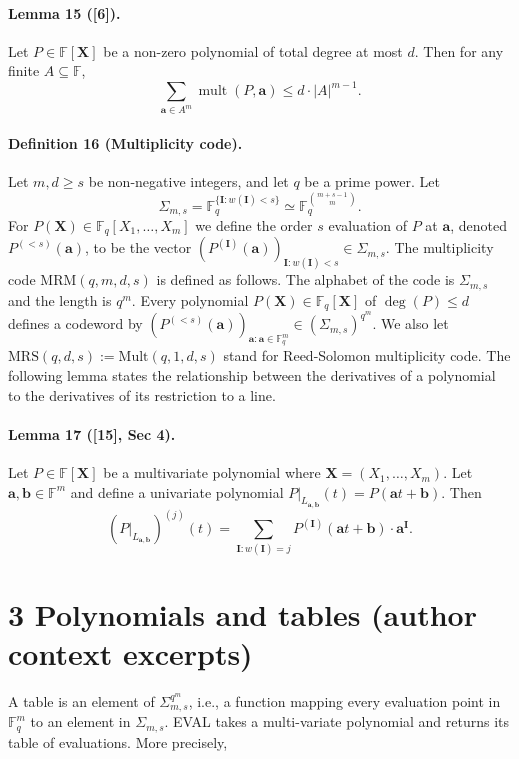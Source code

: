 \documentclass[10pt,a4paper]{article}
\begin{document}
\paragraph{Lemma 15 ([6]).} Let $P\in\mathbb F[\boldsymbol X]$ be a non-zero polynomial of total degree at most $d$. Then for any finite $A\subseteq\mathbb F$,
\[\sum_{\boldsymbol a\in A^m}\operatorname{mult}(P,\boldsymbol a)\leq d\cdot|A|^{m-1}.\]
\paragraph{Definition 16 (Multiplicity code).} Let $m,d\geq s$ be non-negative integers, and let $q$ be a prime power. Let
\[\Sigma_{m,s}=\mathbb F_q^{\{\boldsymbol I:w(\boldsymbol I)<s\}}\simeq\mathbb F_q^{\binom{m+s-1}{m}}.\]
For $P(\boldsymbol X)\in\mathbb F_q[X_1,\ldots,X_m]$ we define the order $s$ evaluation of $P$ at $\boldsymbol a$, denoted $P^{(<s)}(\boldsymbol a)$, to be the vector $(P^{(\boldsymbol I)}(\boldsymbol a))_{\boldsymbol I:w(\boldsymbol I)<s}\in\Sigma_{m,s}$. The multiplicity code $\mathrm{MRM}(q,m,d,s)$ is defined as follows. The alphabet of the code is $\Sigma_{m,s}$ and the length is $q^m$. Every polynomial $P(\boldsymbol X)\in\mathbb F_q[\boldsymbol X]$ of $\deg(P)\leq d$ defines a codeword by $(P^{(<s)}(\boldsymbol a))_{\boldsymbol a:\boldsymbol a\in\mathbb F_q^m}\in(\Sigma_{m,s})^{q^m}$.
We also let $\mathrm{MRS}(q,d,s):=\mathrm{Mult}(q,1,d,s)$ stand for Reed-Solomon multiplicity code.
The following lemma states the relationship between the derivatives of a polynomial to the derivatives of its restriction to a line.
\paragraph{Lemma 17 ([15], Sec 4).} Let $P\in\mathbb F[\boldsymbol X]$ be a multivariate polynomial where $\boldsymbol X=(X_1,\ldots,X_m)$. Let $\boldsymbol a,\boldsymbol b\in\mathbb F^m$ and define a univariate polynomial $P|_{L_{\boldsymbol a,\boldsymbol b}}(t)=P(\boldsymbol a t+\boldsymbol b)$. Then
\[(P|_{L_{\boldsymbol a,\boldsymbol b}})^{(j)}(t)=\sum_{\boldsymbol I:w(\boldsymbol I)=j}P^{(\boldsymbol I)}(\boldsymbol a t+\boldsymbol b)\cdot\boldsymbol a^{\boldsymbol I}.\]
\section*{3 Polynomials and tables (author context excerpts)}
A table is an element of $\Sigma_{m,s}^{q^m}$, i.e., a function mapping every evaluation point in $\mathbb F_q^m$ to an element in $\Sigma_{m,s}$. EVAL takes a multi-variate polynomial and returns its table of evaluations. More precisely,
\end{document}
